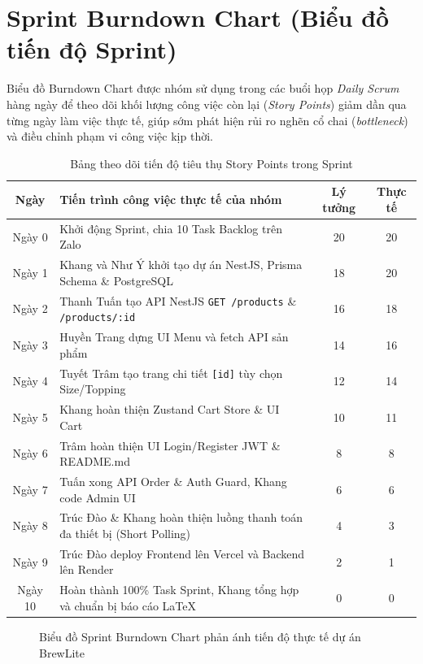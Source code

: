 \section{Sprint Burndown Chart (Biểu đồ tiến độ Sprint)}
Biểu đồ Burndown Chart được nhóm sử dụng trong các buổi họp \textit{Daily Scrum} hàng ngày để theo dõi khối lượng công việc còn lại (\textit{Story Points}) giảm dần qua từng ngày làm việc thực tế, giúp sớm phát hiện rủi ro nghẽn cổ chai (\textit{bottleneck}) và điều chỉnh phạm vi công việc kịp thời.

\begin{table}[h]
\centering
\caption{Bảng theo dõi tiến độ tiêu thụ Story Points trong Sprint}
\label{tab:burndown-data}
\begin{tabular}{c p{8.5cm} c c}
\toprule
\textbf{Ngày} & \textbf{Tiến trình công việc thực tế của nhóm} & \textbf{Lý tưởng} & \textbf{Thực tế} \\ \midrule
Ngày 0 & Khởi động Sprint, chia 10 Task Backlog trên Zalo & 20 & 20 \\
Ngày 1 & Khang và Như Ý khởi tạo dự án NestJS, Prisma Schema \& PostgreSQL & 18 & 20 \\
Ngày 2 & Thanh Tuấn tạo API NestJS \texttt{GET /products} \& \texttt{/products/:id} & 16 & 18 \\
Ngày 3 & Huyền Trang dựng UI Menu và fetch API sản phẩm & 14 & 16 \\
Ngày 4 & Tuyết Trâm tạo trang chi tiết \texttt{[id]} tùy chọn Size/Topping & 12 & 14 \\
Ngày 5 & Khang hoàn thiện Zustand Cart Store \& UI Cart & 10 & 11 \\
Ngày 6 & Trâm hoàn thiện UI Login/Register JWT \& README.md & 8 & 8 \\
Ngày 7 & Tuấn xong API Order \& Auth Guard, Khang code Admin UI & 6 & 6 \\
Ngày 8 & Trúc Đào \& Khang hoàn thiện luồng thanh toán đa thiết bị (Short Polling) & 4 & 3 \\
Ngày 9 & Trúc Đào deploy Frontend lên Vercel và Backend lên Render & 2 & 1 \\
Ngày 10 & Hoàn thành 100\% Task Sprint, Khang tổng hợp và chuẩn bị báo cáo LaTeX & 0 & 0 \\ \bottomrule
\end{tabular}
\end{table}

\begin{figure}[h]
    \centering
    \caption{Biểu đồ Sprint Burndown Chart phản ánh tiến độ thực tế dự án BrewLite}
    \label{fig:burndown-chart}
\end{figure}

